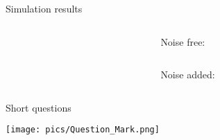 \documentclass[../main.tex]{subfiles}
\begin{document}
\begin{frame}[t]{Simulation results}
\begin{columns}[t]
\begin{column}{0.3\textwidth}
\end{column}

\begin{column}{0.7\textwidth}
\centering
{}
	{
		Noise free:
		\begin{columns}[t]
		\begin{column}{0.55\textwidth}
			\centering
			\begin{adjustbox}{width=1\columnwidth}
			
			\end{adjustbox}
		\end{column}
		\begin{column}{0.55\textwidth}
			\centering
			\begin{adjustbox}{width=1\columnwidth}
			
			\end{adjustbox}
		\end{column}
		\end{columns}
		Noise added:
		\begin{columns}[t]
		\begin{column}{0.55\textwidth}
			\centering
			\begin{adjustbox}{width=1\columnwidth}
			
			\end{adjustbox}
		\end{column}
		\begin{column}{0.55\textwidth}
			\centering
			\begin{adjustbox}{width=1\columnwidth}
			
			\end{adjustbox}
		\end{column}
		\end{columns}
	}

\end{column}

\end{columns}

\end{frame}


\begin{frame}[fragile]{Short questions}

\centering
\texttt{[image: pics/Question\_Mark.png]}

\end{frame}
\end{document}
